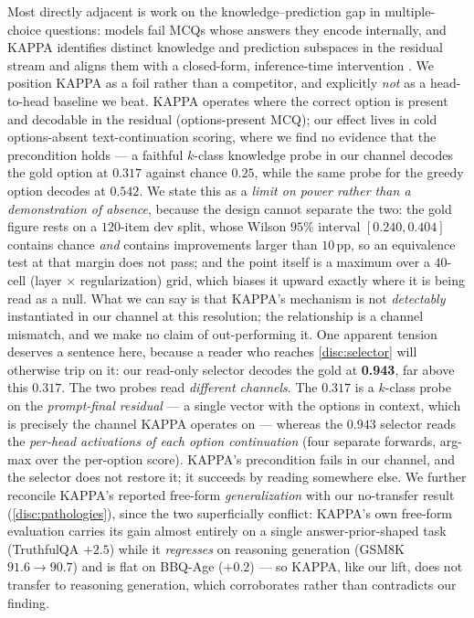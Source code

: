 Most directly adjacent is work on the knowledge--prediction gap in multiple-choice
questions: models fail MCQs whose answers they encode internally, and KAPPA
identifies distinct knowledge and prediction subspaces in the residual stream and
aligns them with a closed-form, inference-time intervention \citep{KAPPA}. We
position KAPPA as a foil rather than a competitor, and explicitly \emph{not} as a
head-to-head baseline we beat. KAPPA operates where the correct option is present
and decodable in the residual (options-present MCQ); our effect lives in cold
options-absent text-continuation scoring, where we find no evidence that the
precondition holds --- a
faithful $k$-class knowledge probe in our channel decodes the gold option at
$0.317$ against chance $0.25$, while the same probe for the greedy option
decodes at $0.542$. We state this as a \emph{limit on power rather than a
demonstration of absence}, because the design cannot separate the two: the gold
figure rests on a $120$-item dev split, whose Wilson $95\%$ interval
$[0.240, 0.404]$ contains chance \emph{and} contains improvements larger than
$10$\,pp, so an equivalence test at that margin does not pass; and the point itself
is a maximum over a $40$-cell (layer $\times$ regularization) grid, which biases it
upward exactly where it is being read as a null. What we can say is that KAPPA's
mechanism is not \emph{detectably} instantiated in our channel at this resolution;
the relationship is a channel mismatch, and we make no claim of out-performing it.
One apparent tension deserves a sentence here, because a reader who reaches
\cref{disc:selector} will otherwise trip on it: our read-only selector decodes the
gold at \textbf{0.943}, far above this $0.317$. The two probes read \emph{different
channels}. The $0.317$ is a $k$-class probe on the \emph{prompt-final residual} ---
a single vector with the options in context, which is precisely the channel KAPPA
operates on --- whereas the $0.943$ selector reads the \emph{per-head activations of
each option continuation} (four separate forwards, arg-max over the per-option
score). KAPPA's precondition fails in our channel, and the selector does not restore
it; it succeeds by reading somewhere else. We further reconcile KAPPA's reported
free-form \emph{generalization} with our no-transfer result
(\cref{disc:pathologies}), since the two superficially conflict: KAPPA's own
free-form evaluation carries its gain almost entirely on a single
answer-prior-shaped task (TruthfulQA $+2.5$) while it \emph{regresses} on reasoning
generation (GSM8K $91.6{\rightarrow}90.7$) and is flat on BBQ-Age ($+0.2$) --- so
KAPPA, like our lift, does not transfer to reasoning generation, which corroborates
rather than contradicts our finding.

